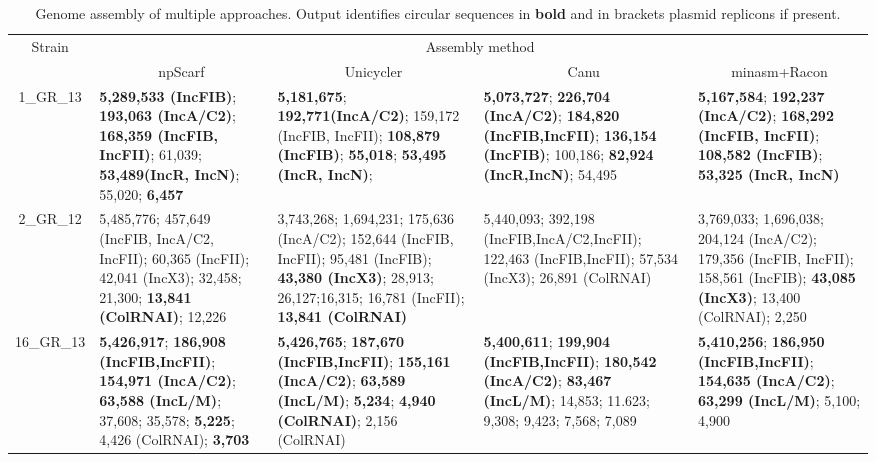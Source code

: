 \begin{landscape}
\begin{table}[!hpt]
\centering
\small
\caption[Genome assembly of multiple approaches.]{Genome assembly of multiple approaches. Output identifies circular sequences in \textbf{bold} and in brackets plasmid replicons if present.}
\label{tab:assers}
\begin{tabular}{|c|p{5cm}|p{5cm}|p{5cm}|p{5cm}|}
\hline
\multirow{2}{*}{Strain} & \multicolumn{4}{c|}{Assembly method}\\ \cline{2-5} 
                        & \multicolumn{1}{c|}{npScarf}  & \multicolumn{1}{c|}{Unicycler}    & \multicolumn{1}{c|}{Canu} & \multicolumn{1}{c|}{minasm+Racon} \\ \hline
1\_GR\_13               & \textbf{5,289,533 (IncFIB)}; \textbf{193,063 (IncA/C2)}; \textbf{168,359 (IncFIB, IncFII)}; 61,039; \textbf{53,489(IncR, IncN)}; 55,020; \textbf{6,457}              & \textbf{5,181,675}; \textbf{192,771(IncA/C2)}; 159,172 (IncFIB, IncFII); \textbf{108,879 (IncFIB)}; \textbf{55,018}; \textbf{53,495 (IncR, IncN)};                                                        & \textbf{5,073,727}; \textbf{226,704 (IncA/C2)}; \textbf{184,820 (IncFIB,IncFII)}; \textbf{136,154 (IncFIB)}; 100,186; \textbf{82,924 (IncR,IncN)}; 54,495       & \textbf{5,167,584}; \textbf{192,237 (IncA/C2)}; \textbf{168,292 (IncFIB, IncFII)}; \textbf{108,582 (IncFIB)}; \textbf{53,325 (IncR, IncN)}                                \\ \hline
2\_GR\_12               & 5,485,776; 457,649 (IncFIB, IncA/C2, IncFII); 60,365 (IncFII); 42,041 (IncX3); 32,458; 21,300; \textbf{13,841 (ColRNAI)}; 12,226 & 3,743,268; 1,694,231; 175,636 (IncA/C2); 152,644 (IncFIB, IncFII); 95,481 (IncFIB); \textbf{43,380 (IncX3)}; 28,913; 26,127;16,315; 16,781 (IncFII); \textbf{13,841 (ColRNAI)} & 5,440,093; 392,198 (IncFIB,IncA/C2,IncFII); 122,463 (IncFIB,IncFII); 57,534 (IncX3); 26,891 (ColRNAI)              & 3,769,033; 1,696,038; 204,124 (IncA/C2); 179,356 (IncFIB, IncFII); 158,561 (IncFIB); \textbf{43,085 (IncX3)}; 13,400 (ColRNAI); 2,250 \\ \hline
16\_GR\_13              & \textbf{5,426,917}; \textbf{186,908 (IncFIB,IncFII)}; \textbf{154,971 (IncA/C2)}; \textbf{63,588 (IncL/M)}; 37,608; 35,578; \textbf{5,225}; 4,426 (ColRNAI); \textbf{3,703}   & \textbf{5,426,765}; \textbf{187,670 (IncFIB,IncFII)}; \textbf{155,161 (IncA/C2)}; \textbf{63,589 (IncL/M)}; \textbf{5,234}; \textbf{4,940 (ColRNAI)}; 2,156 (ColRNAI)                                              & \textbf{5,400,611}; \textbf{199,904 (IncFIB,IncFII)}; \textbf{180,542 (IncA/C2)}; \textbf{83,467 (IncL/M)}; 14,853; 11.623; 9,308; 9,423; 7,568; 7,089 & \textbf{5,410,256}; \textbf{186,950 (IncFIB,IncFII)}; \textbf{154,635 (IncA/C2)}; \textbf{63,299 (IncL/M)}; 5,100; 4,900                                         \\ \hline

\end{tabular}
\end{table}
\end{landscape}
